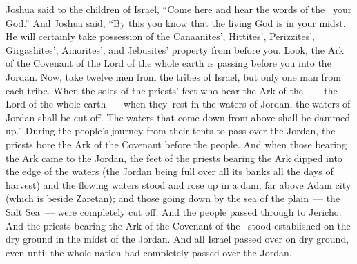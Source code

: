 \begin{inparaenum}
   Joshua said to the children of Israel, ``Come here and hear the words of the \lord\ your God.''%
   And Joshua said, ``By this you know that the living God is in your midst. He will certainly take possession of the Canaanites', Hittites', Perizzites', Girgashites', Amorites', and Jebusites' property from before you.%
   Look, the Ark of the Covenant of the Lord of the whole earth is passing before you into the Jordan.%
   Now, take twelve men from the tribes of Israel, but only one man from each tribe.%
   When the soles of the priests' feet who bear the Ark of the \lord~--- the Lord of the whole earth~--- when they\understood\ rest in the waters of Jordan, the waters of Jordan shall be cut off. The waters that come down from above shall be dammed up.''%
   During the people's journey from their tents to pass over the Jordan, the priests bore the Ark of the Covenant before the people.%
   And when those bearing the Ark came to the Jordan, the feet of the priests bearing the Ark dipped into the edge of the waters (the Jordan being full over all its banks all the days of harvest)%
   and the flowing waters stood and rose up in a dam, far above Adam city (which is beside Zaretan); and those going down by the sea of the plain~--- the Salt Sea~--- were completely cut off. And the people passed through to Jericho.%
   And the priests bearing the Ark of the Covenant of the \lord\ stood established on the dry ground in the midst of the Jordan. And all Israel passed over on dry ground, even until the whole nation had completely passed over the Jordan.%
\end{inparaenum}
